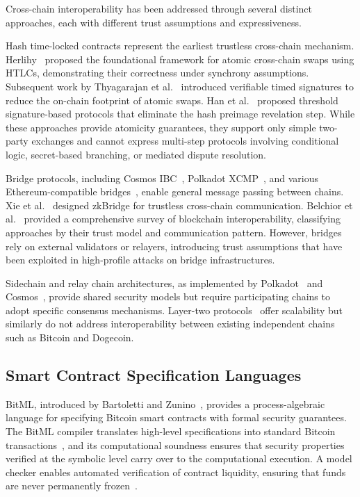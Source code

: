 \documentclass[journal]{IEEEtran}
\begin{document}
Cross-chain interoperability has been addressed through several distinct approaches, each with different trust assumptions and expressiveness.

Hash time-locked contracts represent the earliest trustless cross-chain mechanism. Herlihy~\cite{herlihy2018atomic} proposed the foundational framework for atomic cross-chain swaps using HTLCs, demonstrating their correctness under synchrony assumptions. Subsequent work by Thyagarajan et al.~\cite{thyagarajan2022universal} introduced verifiable timed signatures to reduce the on-chain footprint of atomic swaps. Han et al.~\cite{han2019threshold} proposed threshold signature-based protocols that eliminate the hash preimage revelation step. While these approaches provide atomicity guarantees, they support only simple two-party exchanges and cannot express multi-step protocols involving conditional logic, secret-based branching, or mediated dispute resolution.

Bridge protocols, including Cosmos IBC~\cite{kwon2019cosmos}, Polkadot XCMP~\cite{wood2016polkadot}, and various Ethereum-compatible bridges~\cite{wood2014ethereum}, enable general message passing between chains. Xie et al.~\cite{xie2022bridge} designed zkBridge for trustless cross-chain communication. Belchior et al.~\cite{belchior2021survey} provided a comprehensive survey of blockchain interoperability, classifying approaches by their trust model and communication pattern. However, bridges rely on external validators or relayers, introducing trust assumptions that have been exploited in high-profile attacks on bridge infrastructures.

Sidechain and relay chain architectures, as implemented by Polkadot~\cite{wood2016polkadot} and Cosmos~\cite{kwon2019cosmos}, provide shared security models but require participating chains to adopt specific consensus mechanisms. Layer-two protocols~\cite{gudgeon2020defi} offer scalability but similarly do not address interoperability between existing independent chains such as Bitcoin and Dogecoin.

\subsection{Smart Contract Specification Languages}

BitML, introduced by Bartoletti and Zunino~\cite{bartoletti2018bitml}, provides a process-algebraic language for specifying Bitcoin smart contracts with formal security guarantees. The BitML compiler translates high-level specifications into standard Bitcoin transactions~\cite{atzei2019developing}, and its computational soundness ensures that security properties verified at the symbolic level carry over to the computational execution. A model checker enables automated verification of contract liquidity, ensuring that funds are never permanently frozen~\cite{bartoletti2019bitml}.
\end{document}
